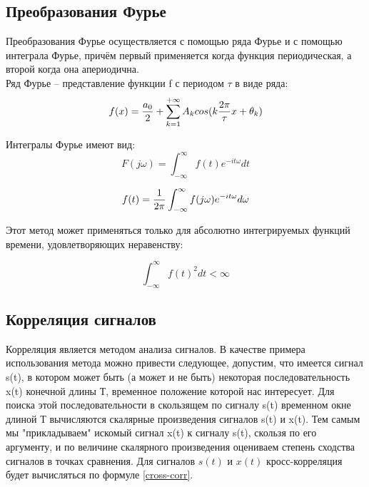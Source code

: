 \documentclass[a4paper,14pt]{extarticle}
\begin{document}
\subsection{Преобразования Фурье}

Преобразования Фурье осуществляется с помощью ряда Фурье и с 
помощью интеграла Фурье, причём первый применяется когда функция 
периодическая, а второй когда она апериодична.\\

Ряд Фурье -- представление функции f с периодом $\tau$ в виде 
ряда:
\begin{equation}
f(x) = {a_0\over 2} + \sum_{k=1}^{+\infty}A_k cos(k{2\pi\over 
\tau}x + \theta_k)
\end{equation}

Интегралы Фурье имеют вид:
\begin{equation}
F(j\omega) = \int_{-\infty}^{\infty} f(t) e^{-it\omega} dt
\end{equation}

\begin{equation}
f(t) = {{1}\over{2\pi}} \int_{-\infty}^{\infty} f(j\omega) e^{-it
\omega} d\omega
\end{equation}

Этот метод может применяться только для абсолютно интегрируемых 
функций времени, удовлетворяющих неравенству:

\begin{equation}
\int_{-\infty}^{\infty} {f(t)}^2  dt < \infty
\end{equation}

\subsection{Корреляция сигналов}

Корреляция является методом анализа сигналов. В качестве примера использования метода можно привести следующее, допустим, что имеется сигнал s(t), в котором может быть (а может и не быть) некоторая последовательность x(t) конечной длины Т, временное положение которой нас интересует. Для поиска этой последовательности в скользящем по сигналу s(t) временном окне длиной Т вычисляются скалярные произведения сигналов s(t) и x(t). Тем самым мы "прикладываем" искомый сигнал x(t) к сигналу s(t), скользя по его аргументу, и по величине скалярного произведения оцениваем степень сходства сигналов в точках сравнения. Для сигналов $s(t)$ и $x(t)$ кросс-корреляция будет вычисляться по формуле \ref{cross-corr}.
\end{document}
